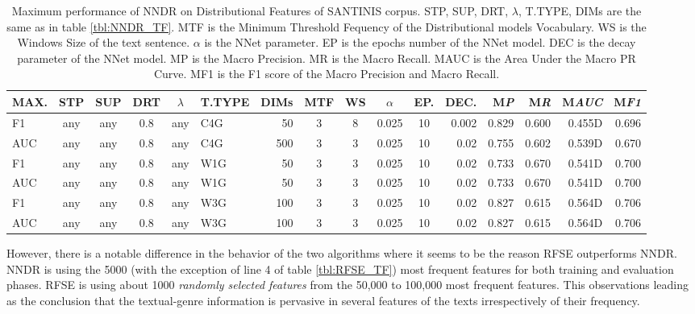 \documentclass[runningheads]{llncs}
\begin{document}
\begin{table}
\center
\begin{tabular}{|l|cccc|lr|ccccr|rrrr|}
\hline
MAX. & STP & SUP & DRT & $\lambda$ & T.TYPE & DIMs & MTF & WS & $\alpha$ & EP. & DEC. & M\emph{P} & M\emph{R} & M\emph{AUC} & M\emph{F1} \\
\hline
F1 & any & any & 0.8 & any & C4G & 50 & 3 & 8 & 0.025 & 10 & 0.002 & 0.829 & 0.600 & 0.455D & 0.696 \\
AUC & any & any & 0.8 & any & C4G & 500 & 3 & 3 & 0.025 & 10 & 0.02 & 0.755 & 0.602 & 0.539D & 0.670 \\
F1 & any & any & 0.8 & any & W1G & 50 & 3 & 3 & 0.025 & 10 & 0.02 & 0.733 & 0.670 & 0.541D & 0.700 \\
AUC & any & any & 0.8 & any & W1G & 50 & 3 & 3 & 0.025 & 10 & 0.02 & 0.733 & 0.670 & 0.541D & 0.700 \\
F1 & any & any & 0.8 & any & W3G & 100 & 3 & 3 & 0.025 & 10 & 0.02 & 0.827 & 0.615 & 0.564D & 0.706 \\
AUC & any & any & 0.8 & any & W3G & 100 & 3 & 3 & 0.025 & 10 & 0.02 & 0.827 & 0.615 & 0.564D & 0.706 \\
\hline
\end{tabular}
\caption {Maximum performance of NNDR on Distributional Features of SANTINIS corpus. STP, SUP, DRT, $\lambda$, T.TYPE, DIMs are the same as in table \ref{tbl:NNDR_TF}. MTF is the Minimum Threshold Fequency of the Distributional models Vocabulary. WS is the Windows Size of the text sentence. $\alpha$ is the NNet parameter. EP is the epochs number of the NNet model. DEC is the decay parameter of the NNet model. MP is the Macro Precision. MR is the Macro Recall. MAUC is the Area Under the Macro PR Curve. MF1 is the F1 score of the Macro Precision and Macro Recall.}
\label{tbl:NNDR_Gensim}
\vspace{-20mm}
\end{table}

\pagebreak


However, there is a notable difference in the behavior of the two algorithms where it seems to be the reason RFSE outperforms NNDR. NNDR is using the 5000 (with the exception of line 4 of table \ref{tbl:RFSE_TF}) most frequent features for both training and evaluation phases. RFSE is using about 1000 \textit{randomly selected features} from the 50,000 to 100,000 most frequent features. This observations leading as the conclusion that the textual-genre information is pervasive in several features of the texts irrespectively of their frequency.
\end{document}
